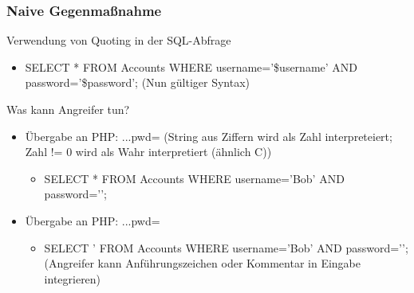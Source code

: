 \subsubsection*{Naive Gegenmaßnahme}
Verwendung von Quoting in der SQL-Abfrage
\begin{itemize}
    \item SELECT * FROM Accounts WHERE username='\$username' AND password='\$password'; (Nun gültiger Syntax)
\end{itemize}
Was kann Angreifer tun?
\begin{itemize}
    \item Übergabe an PHP: ...pwd= (String aus Ziffern wird als Zahl interpreteiert; Zahl != 0 wird als Wahr interpretiert (ähnlich C))
    \begin{itemize}
        \item SELECT * FROM Accounts WHERE username='Bob' AND password='';
    \end{itemize}
    \item Übergabe an PHP: ...pwd=
    \begin{itemize}
        \item SELECT ' FROM Accounts WHERE username='Bob' AND password=''; (Angreifer kann Anführungszeichen oder Kommentar in Eingabe integrieren)
    \end{itemize}
\end{itemize}

